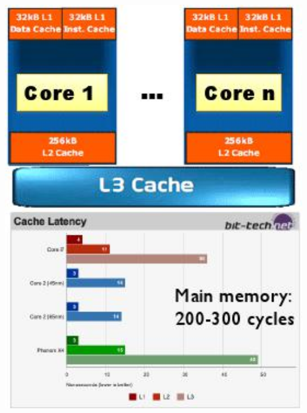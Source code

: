 \documentclass[9pt]{beamer}
\begin{document}
{\begin{columns}
  \begin{column}{0.4\textwidth}
  \begin{center}
    \includegraphics[width=0.99\textwidth]{figs/memory-wall.jpeg}
  \end{center}
  \end{column}
  \end{columns}
}
\end{document}
